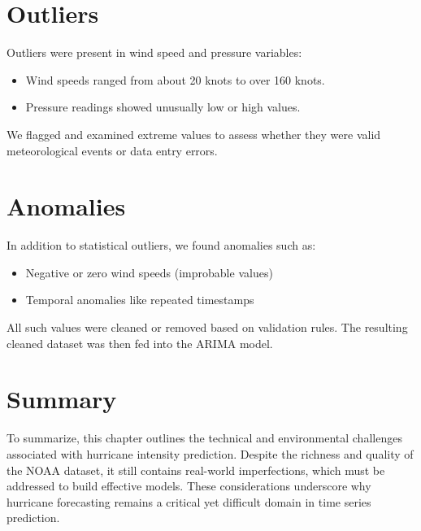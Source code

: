 \section{Outliers}
Outliers were present in wind speed and pressure variables:

\begin{itemize}
	\item Wind speeds ranged from about 20 knots to over 160 knots.
	\item Pressure readings showed unusually low or high values.
\end{itemize}

We flagged and examined extreme values to assess whether they were valid meteorological events or data entry errors.

\section{Anomalies}
In addition to statistical outliers, we found anomalies such as:

\begin{itemize}
	\item Negative or zero wind speeds (improbable values)
	\item Temporal anomalies like repeated timestamps
\end{itemize}

All such values were cleaned or removed based on validation rules. The resulting cleaned dataset was then fed into the ARIMA model.

\section{Summary}
To summarize, this chapter outlines the technical and environmental challenges associated with hurricane intensity prediction. Despite the richness and quality of the NOAA dataset, it still contains real-world imperfections, which must be addressed to build effective models. These considerations underscore why hurricane forecasting remains a critical yet difficult domain in time series prediction.

